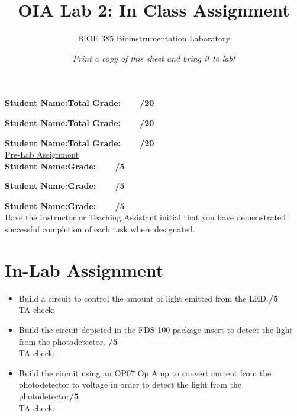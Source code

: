 \documentclass{article}
\title{OIA Lab 2: In Class Assignment}
\author{BIOE 385 Bioinstrumentation Laboratory}
\date{\textit{Print a copy of this sheet and bring it to lab!}}
\begin{document}
\large
\maketitle

\textbf{Student Name:}\hfill 	\textbf{Total Grade:\ \ \ \ /20}\vspace{0.5cm}

\textbf{Student Name:}\hfill 	\textbf{Total Grade:\ \ \ \ /20}\vspace{0.5cm}

\textbf{Student Name:}\hfill 	\textbf{Total Grade:\ \ \ \ /20}\\

\underline{Pre-Lab Assignment}\\

\textbf{Student Name:}\hfill 	\textbf{Grade:\ \ \ \ /5}\vspace{0.5cm}

\textbf{Student Name:}\hfill 	\textbf{Grade:\ \ \ \ /5}\vspace{0.5cm}

\textbf{Student Name:}\hfill 	\textbf{Grade:\ \ \ \ /5}\\

Have the Instructor or Teaching Assistant initial that you have demonstrated successful completion of each task where designated.

\section*{In-Lab Assignment}
\begin{itemize}
	\item Build a circuit to control the amount of light emitted from the LED.\hfill \textbf{\underline{\hspace{1cm}}/5}\\TA check: \underline{\hspace{2cm}}\\
	\item Build the circuit depicted in the FDS 100 package insert to detect the light from the photodetector. \hfill \textbf{\underline{\hspace{1cm}}/5}\\TA check: \underline{\hspace{2cm}}\\
	\item Build the circuit using an OP07 Op Amp to convert current from the photodetector to voltage in order to detect the light from the photodetector\hfill \textbf{\underline{\hspace{1cm}}/5}\\TA check: \underline{\hspace{2cm}}
\end{itemize}
\end{document}
